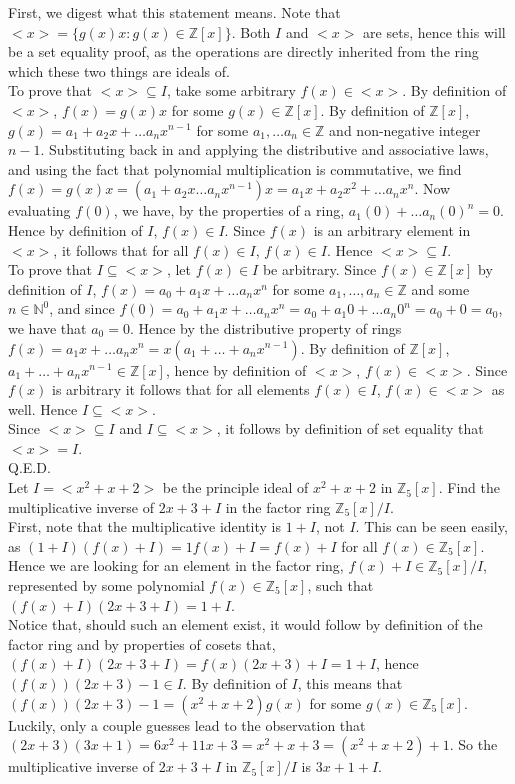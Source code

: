 \documentclass{article}
\newcommand{\N}{\mathbb{N}}
\newcommand{\Z}{\mathbb{Z}}
\begin{document}
 First, we digest what this statement means. Note that $<x> = \{g(x)x: g(x)\in \Z[x]\}$. Both $I$ and $<x>$ are sets, hence this will be a set equality proof, as the operations are directly inherited from the ring which these two things are ideals of.\\
To prove that $<x>\subseteq I$, take some arbitrary $f(x)\in <x>$. By definition of $<x>$, $f(x) = g(x)x$ for some $g(x)\in \Z[x]$. By definition of $\Z[x]$, $g(x) = a_1 + a_2x + \dots a_n x^{n -1}$ for some $a_1, \dots a_n\in \Z$ and non-negative integer $n-1$. Substituting back in and applying the distributive and associative laws, and using the fact that polynomial multiplication is commutative, we find $f(x) = g(x)x = (a_ 1 + a_2 x\dots a_nx^{n-1})x = a_1 x + a_2 x^2 + \dots a_n x^n$. Now evaluating $f(0)$, we have, by the properties of a ring, $a_1(0) + \dots a_n(0)^n = 0.$ Hence by definition of $I$, $f(x) \in I$. Since $f(x)$ is an arbitrary element in $<x>$, it follows that for all $f(x)\in I$, $f(x)\in I$. Hence $<x>\subseteq I$.\\
To prove that $I\subseteq <x>$, let $f(x)\in I$ be arbitrary. Since $f(x)\in \Z[x]$ by definition of $I$, $f(x) = a_0 + a_1x + \dots a_n x^n$ for some $a_1,\dots, a_n \in \Z$ and some $n\in \N^0$, and since $f(0) = a_0 + a_1x + \dots a_n x^n = a_0 + a_1 0 + \dots a_n 0^n = a_0 + 0 = a_0$, we have that $a_0 = 0$. Hence by the distributive property of rings $f(x) = a_1x + \dots a_n x^n = x(a_1+ \dots + a_n x^{n-1})$. By definition of $\Z[x]$, $a_1 + \dots + a_n x^{n-1}\in \Z[x]$, hence by definition of $<x>$, $f(x) \in <x>$. Since $f(x)$ is arbitrary it follows that for all elements $f(x)\in I$, $f(x)\in <x>$ as well. Hence $I \subseteq <x>$.\\
Since $<x> \subseteq I$ and $I \subseteq <x>$, it follows by definition of set equality that $<x> = I$.\\
Q.E.D.\\

 Let $I = <x^2 + x + 2>$ be the principle ideal of $x^2 + x +2$ in $\Z_5[x]$. Find the multiplicative inverse of $2x + 3 + I$ in the factor ring $\Z_5[x]/I$. \\

 First, note that the multiplicative identity is $1 + I$, not $I$. This can be seen easily, as $(1 + I)(f(x) + I) = 1f(x) + I = f(x) + I$ for all $f(x)\in \Z_5[x]$. Hence we are looking for an element in the factor ring, $f(x) + I \in \Z_5[x]/I$, represented by some polynomial $f(x)\in \Z_5[x]$, such that $(f(x) + I) (2x+ 3 + I) = 1 + I$.\\

Notice that, should such an element exist, it would follow by definition of the factor ring and by properties of cosets that, $(f(x) + I) (2x+ 3 + I) = f(x)(2x +3) + I = 1 + I$, hence $(f(x)) (2x+ 3 ) - 1 \in I$. By definition of $I$, this means that $ (f(x)) (2x+ 3) - 1  = (x^2 + x + 2)g(x)$ for some $g(x) \in \Z_5[x].$ Luckily, only a couple guesses lead to the observation that $(2x + 3)(3x + 1) = 6x^2 + 11x + 3 = x^2 + x + 3 = (x^2 + x + 2) + 1$. So the multiplicative inverse of $2x + 3 + I$ in $\Z_5[x]/I$ is $3x + 1 + I$. 
\end{document}
